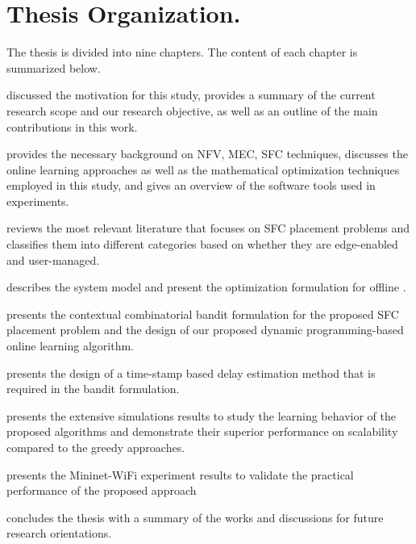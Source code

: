 \section{Thesis Organization.}
The thesis is divided into nine chapters. The content of each chapter is summarized below.

 discussed the motivation for this study, provides a summary of the current research scope and our research objective, as well as an outline of the main contributions in this work.

  provides the necessary background on NFV, MEC, SFC techniques, discusses the online learning approaches as well as the mathematical optimization techniques employed in this study, and gives an overview of the software tools used in experiments.

 reviews the most relevant literature that focuses on SFC placement problems and classifies them into different categories based on whether they are edge-enabled and user-managed.

 describes the system model and present the optimization formulation for offline \myproblem.

 presents the contextual combinatorial bandit formulation for the proposed SFC placement problem and the design of our proposed dynamic programming-based online learning algorithm.

 presents the design of a time-stamp based delay estimation method that is required in the bandit formulation.

 presents the extensive simulations results to study the learning behavior of the proposed algorithms and demonstrate their superior performance on scalability compared to the greedy approaches. 

 presents the Mininet-WiFi experiment results to validate the practical performance of the proposed approach 

 concludes the thesis with a summary of the works and discussions for future research orientations.








